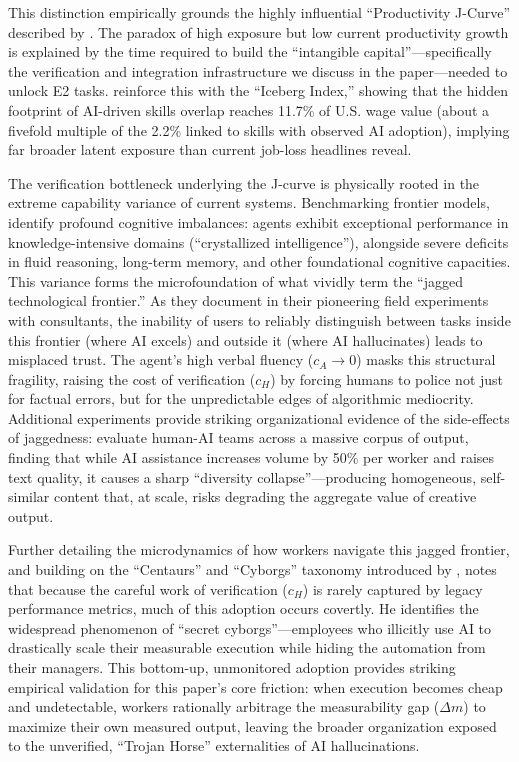 \documentclass[12pt, letter]{article}
\begin{document}
This distinction empirically grounds the highly influential ``Productivity J-Curve'' described by \citet{BrynjolfssonRockSyverson2021}. The paradox of high exposure but low current productivity growth is explained by the time required to build the ``intangible capital''---specifically the verification and integration infrastructure we discuss in the paper---needed to unlock E2 tasks. \citet{Chopra2025} reinforce this with the ``Iceberg Index,'' showing that the hidden footprint of AI-driven skills overlap reaches 11.7\% of U.S. wage value (about a fivefold multiple of the 2.2\% linked to skills with observed AI adoption), implying far broader latent exposure than current job-loss headlines reveal.

The verification bottleneck underlying the J-curve is physically rooted in the extreme capability variance of current systems. Benchmarking frontier models, \citet{Hendrycks2025} identify profound cognitive imbalances: agents exhibit exceptional performance in knowledge-intensive domains (``crystallized intelligence''), alongside severe deficits in fluid reasoning, long-term memory, and other foundational cognitive capacities. This variance forms the microfoundation of what \citet{DellAcqua2023} vividly term the ``jagged technological frontier.'' As they document in their pioneering field experiments with consultants, the inability of users to reliably distinguish between tasks inside this frontier (where AI excels) and outside it (where AI hallucinates) leads to misplaced trust. The agent's high verbal fluency ($c_A \to 0$) masks this structural fragility, raising the cost of verification ($c_H$) by forcing humans to police not just for factual errors, but for the unpredictable edges of algorithmic mediocrity. Additional experiments provide striking organizational evidence of the side-effects of jaggedness: \citet{JuAral2025} evaluate human-AI teams across a massive corpus of output, finding that while AI assistance increases volume by 50\% per worker and raises text quality, it causes a sharp ``diversity collapse''---producing homogeneous, self-similar content that, at scale, risks degrading the aggregate value of creative output.

Further detailing the microdynamics of how workers navigate this jagged frontier, and building on the ``Centaurs'' and ``Cyborgs'' taxonomy introduced by \citet{DellAcqua2023}, \citet{Mollick2024} notes that because the careful work of verification ($c_H$) is rarely captured by legacy performance metrics, much of this adoption occurs covertly. He identifies the widespread phenomenon of ``secret cyborgs''---employees who illicitly use AI to drastically scale their measurable execution while hiding the automation from their managers. This bottom-up, unmonitored adoption provides striking empirical validation for this paper's core friction: when execution becomes cheap and undetectable, workers rationally arbitrage the measurability gap ($\Delta m$) to maximize their own measured output, leaving the broader organization exposed to the unverified, ``Trojan Horse'' externalities of AI hallucinations.
\end{document}
